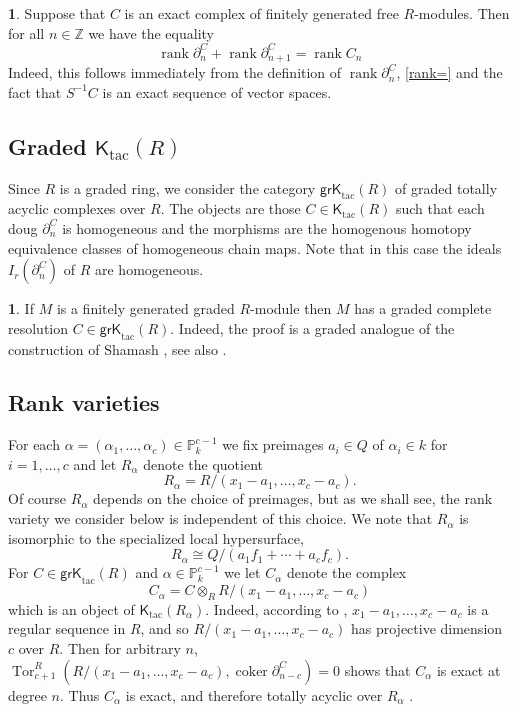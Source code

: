 \documentclass{amsart}[11pt]
\newcommand{\coker}{\operatorname{coker}}
\newcommand{\rank}{\operatorname{rank}}
\newcommand{\Tor}{\operatorname{Tor}}
\newcommand{\Ktac}{\operatorname{\mathsf{K}_{tac}}\nolimits}
\newcommand{\grKtac}{\operatorname{\mathsf{grK}_{tac}}\nolimits}
\numberwithin{equation}{section}
\theoremstyle{plain}
\newtheorem*{Main Theorem}{Main Theorem}
\theoremstyle{definition}
\newtheorem{chunk}[theorem]{}
\theoremstyle{remark}
\numberwithin{equation}{theorem}
\begin{document}
\begin{chunk}\label{rankequality} Suppose that $C$ is an exact complex of finitely generated free $R$-modules. Then for all $n\in\mathbb Z$ we have the equality
\[
\rank\partial^C_n+\rank\partial^C_{n+1}=\rank C_n
\]
Indeed, this follows immediately from the definition of $\rank\partial^C_n$, \ref{rank=} and the fact that $S^{-1}C$ is an exact sequence of vector spaces. 
\end{chunk}

\subsection*{Graded $\Ktac(R)$} Since $R$ is a graded ring, we consider the category
$\grKtac(R)$ of graded totally acyclic complexes over $R$.  The objects are those $C\in \Ktac(R)$ such that each doug $\partial_n^C$ is homogeneous and the morphisms are the homogenous homotopy equivalence classes of homogeneous chain maps. Note that in this case the ideals 
$I_r(\partial^C_n)$ of $R$ are homogeneous.

\begin{chunk}\label{grktac} If $M$ is a finitely generated graded $R$-module then $M$ has a graded complete resolution 
$C\in\grKtac(R)$. Indeed, the proof is a graded analogue of the construction of Shamash 
\cite{Shamash}, see also \cite{E}.
\end{chunk}

\subsection*{Rank varieties}
For each $\alpha=(\alpha_1,\dots,\alpha_c)\in\mathbb P^{c-1}_k$ we fix preimages $a_i\in Q$ of 
$\alpha_i\in k$ for $i=1,\dots,c$ and let $R_\alpha$ denote the quotient
\[
R_\alpha = R/(x_1-a_1,\dots,x_c-a_c).
\]
Of course $R_\alpha$ depends on the choice of preimages, but as we shall see, the rank variety we consider below is independent of this choice.
We note that $R_\alpha$ is isomorphic to the specialized local hypersurface,
\[
R_\alpha\cong Q/(a_1f_1+\cdots+a_cf_c).
\]
For $C\in\grKtac(R)$ and $\alpha\in\mathbb P^{c-1}_k$ we let $C_\alpha$ denote the complex
\[
C_\alpha=C\otimes_R R/(x_1-a_1,\dots,x_c-a_c)
\]
which is an object of $\Ktac(R_\alpha)$. Indeed, according to \cite[pg. 397]{J}, $x_1-a_1,\dots,x_c-a_c$ is a regular sequence in $R$, and so $R/(x_1-a_1,\dots,x_c-a_c)$ has projective dimension $c$ over 
$R$. Then for arbitrary $n$, $\Tor^R_{c+1}(R/(x_1-a_1,\dots,x_c-a_c),\coker\partial^C_{n-c})=0$ shows that $C_\alpha$ is exact at degree $n$. Thus $C_\alpha$ is exact, and therefore totally acyclic over 
$R_\alpha$ \cite[lem. 2.4]{AM}.
\end{document}
